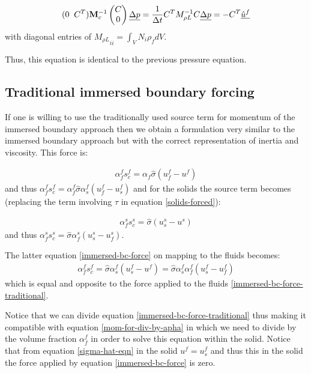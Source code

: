 \begin{eqnarray}
(0 \;\; C^T) {\bf M}_c^{-1}
\begin{pmatrix}
 C \\ 0
\end{pmatrix}
\underline{\Delta p}
= \frac{1}{\Delta t}
C^T M_{\rho L}^{-1} C \underline{\Delta p}= - C^T \underline{ \hat u^f }
\label{delt-p-classic27}
\end{eqnarray}
with diagonal entries of ${M_{\rho L}}_{ii}=\int_V N_i \rho_f dV$.

Thus, this equation is identical to the previous pressure equation.

\subsection{Traditional immersed boundary forcing}
If one is willing to use the traditionally used
source term for momentum of the immersed boundary
approach then we obtain a formulation very similar to the
immersed boundary approach but with the correct
representation of inertia and viscosity.
This force is:

\begin{eqnarray}
\alpha_f^f s_c^f = \alpha_f \hat\sigma (u^f_f -u^f)
\label{immersed-bc-force-traditional}
\end{eqnarray}
and thus $\alpha_f^f s_c^f = \alpha_f^f \hat\sigma \alpha_s^f (u^f_f -u^f_s)$
and for the solids the source term becomes
(replacing the term involving $\tau$ in equation \ref{solids-forced}):

\begin{eqnarray}
\alpha_f^s s_c^s=\hat \sigma (u_s^s -u^s)
\label{immersed-bc-force}
\end{eqnarray}
and thus
$ \alpha_f^s s_c^s=\hat \sigma \alpha_f^s(u_s^s -u^s_f)$.

The latter equation \ref{immersed-bc-force} on mapping to the fluids becomes:
\begin{eqnarray}
\alpha_f^f s_c^f=\hat \sigma \alpha_s^f (u_s^f -u^f)
=\hat\sigma \alpha_s^f \alpha_f^f(u_s^f -u^f_f)
\end{eqnarray} which
is equal and opposite to the force applied to the fluids \ref{immersed-bc-force-traditional}.

Notice that we can divide equation \ref{immersed-bc-force-traditional}
thus making it compatible with equation \ref{mom-for-div-by-apha} in which we need to
divide by the volume fraction $\alpha_f^f$ in order to solve this equation
within the solid.
Notice that from equation \ref{sigma-hat-eqn} in the solid $u^f=u^f_s$ and thus this
in the solid the force applied by equation \ref{immersed-bc-force} is zero.


